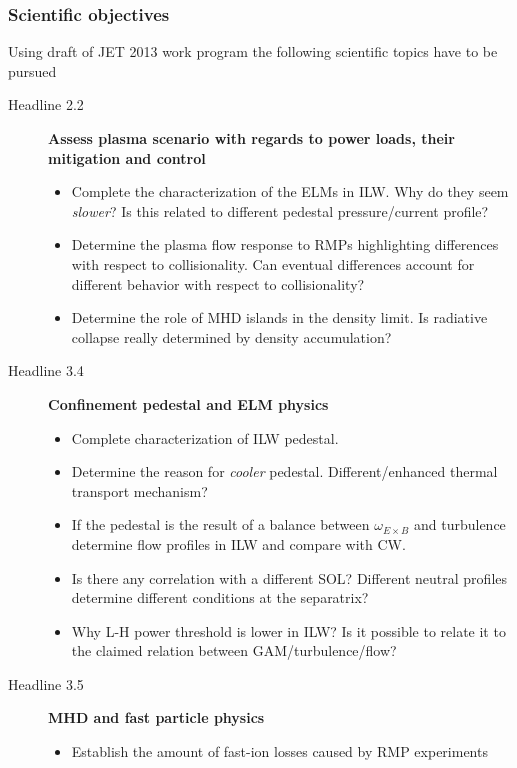 \documentclass[t,10pt]{beamer}
\begin{document}
\begin{frame}[allowframebreaks]
  \frametitle{Scientific objectives}
  Using draft of JET 2013 work program the following scientific topics
  have to be pursued
  \begin{description}
  \item[Headline 2.2] \textbf{Assess plasma scenario with regards to
      power loads, their mitigation and control}
    \begin{itemize}
    \item Complete the characterization of the ELMs in ILW. Why do they
      seem \emph{slower}? Is this related to different pedestal
      pressure/current profile?
    \item Determine the plasma flow response to RMPs highlighting
      differences with respect to collisionality. Can eventual differences account for different behavior with respect to
      collisionality?
    \item Determine the role of MHD islands in the density limit. Is
      radiative collapse really determined by density accumulation?
    \end{itemize}
  \item[Headline 3.4] \textbf{Confinement pedestal and ELM physics}
    \begin{itemize}
    \item Complete characterization of ILW pedestal.
    \item Determine the
      reason for \emph{cooler} pedestal. Different/enhanced thermal
      transport mechanism?
    \item If the pedestal is the result of a balance between
      $\omega_{E\times B}$ and turbulence determine flow profiles in
      ILW and compare with CW.
    \item Is there any correlation with a different SOL? Different
      neutral profiles determine different conditions at the separatrix?
    \item Why L-H power threshold is lower in ILW? Is it possible to
      relate it to the claimed relation between GAM/turbulence/flow? 
    \end{itemize}
  \item[Headline 3.5] \textbf{MHD and fast particle physics}
    \begin{itemize}
    \item Establish the amount of fast-ion losses caused by RMP
      experiments
    \end{itemize}
  \end{description}
\end{frame}
\end{document}
